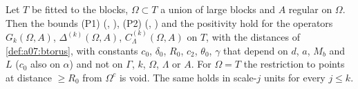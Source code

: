 \begin{lemma}\label{lem:a07:Ptorus}
Let $T$ be fitted to the blocks, $\Omega\subset T$ a union of large blocks and $A$ regular on $\Omega$. Then the bounds \textup{(P1)} (\cite[Prop.~2.1, (2.24)--(2.26)]{Ba1}, \cite[(1.9)--(1.12)]{Ba4}), \textup{(P2)} (\cite[Props.~2.2--2.3]{Ba1}, \cite[(1.13)--(1.20)]{Ba4}) and the positivity \cite[(1.8)]{Ba4} hold for the operators $G_k(\Omega,A)$, $\Delta^{(k)}(\Omega,A)$, $C^{(k)}_\Lambda(\Omega,A)$ on $T$, with the distances of \cref{def:a07:btorus}, with constants $c_0$, $\delta_0$, $R_0$, $c_2$, $\theta_0$, $\gamma$ that depend on $d$, $a$, $M_b$ and $L$ ($c_0$ also on $\alpha$) and not on $\Gamma$, $k$, $\Omega$, $\Lambda$ or $A$. For $\Omega=T$ the restriction to points at distance $\ge R_0$ from $\Omega^c$ is void. The same holds in scale-$j$ units for every $j\le k$.
\end{lemma}

